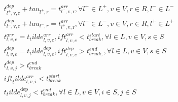 \begin{align}
  & t_{l^{+} ,\text{v},\text{r}}^{\mathit{dep}} + \mathit{tau}_{l^{+} , r} = t_{l^{-} ,\text{v},\text{r}}^{\mathit{arr}} , \forall l^{+} \in L^{+} , v \in V , r \in R , l^{-} \in L^{-} \tag{eq\_0019} \\
  & t_{l^{-} ,\text{v},\text{r}}^{\mathit{dep}} + \mathit{tau}_{l^{-} , r} = t_{l^{+} ,\text{v},\text{r}}^{\mathit{arr}} , \forall l^{-} \in L^{-} , v \in V , r \in R , l^{+} \in L^{+} \tag{eq\_0020} \\
  & t_{l , v , e}^{\mathit{arr}} = t_tilde_{l , v , e}^{\mathit{arr}} , \mathit{ift}_{l , v , e}^{\mathit{arr}} < t_{\mathit{break}}^{\mathit{start}} , \forall l \in L , v \in V , s \in S \tag{eq\_0021} \\
  & t_{l , v , e}^{\mathit{dep}} = t_tilde_{l , v , e}^{\mathit{dep}} , \mathit{ift}_{l , v , e}^{\mathit{dep}} > t_{\mathit{break} ,}^{\mathit{end}} , \forall l \in L , v \in V , s \in S \tag{eq\_0022} \\
  & t_{l , v , j}^{\mathit{dep}} > t_{\mathit{break}}^{\mathit{end}} \tag{eq\_0023\_a} \\
  & \mathit{ift}_tilde_{l , v , i}^{\mathit{arr}} < t_{\mathit{break}}^{\mathit{start}} \tag{eq\_0023\_b} \\
  & t_tilde_{l , v , j}^{\text{dep}} < t_{\mathit{break}}^{\mathit{end}} , \forall l \in L , v \in V , i \in S , j \in S \tag{eq\_0023\_c} \\
\end{align}
